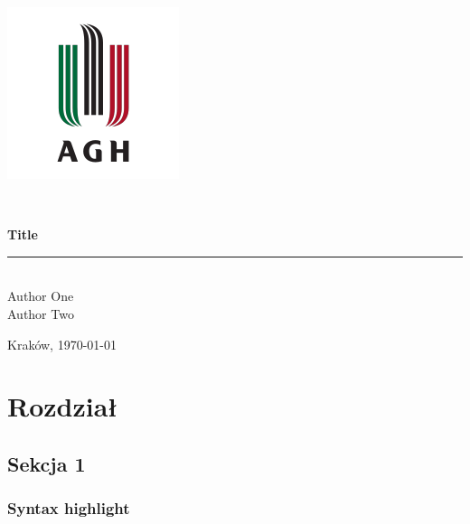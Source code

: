 \documentclass[12pt,a4paper,openright,dvipsnames]{mwrep}
\newcommand{\vtitle}{Title}
\newcommand{\vauthors}{
    Author One\\
    Author Two
}
\begin{document}
\begin{titlepage}

    \centering
    \singlespacing

    \includegraphics[scale=0.5]{common/agh.png}

    \vspace*{0.4cm}

    \\

    \vspace*{0.4cm}


    {\LARGE\bfseries \vtitle\\}
    \rule{3in}{0.4pt} \\
    \large\vauthors



    \centerline{\rmfamily\fontsize{14}{16}\selectfont Kraków, \today}

\end{titlepage}
\newpage

\tableofcontents
\newpage


%
\chapter{Rozdział}

\section{Sekcja 1}

\subsection{Syntax highlight}
\end{document}
